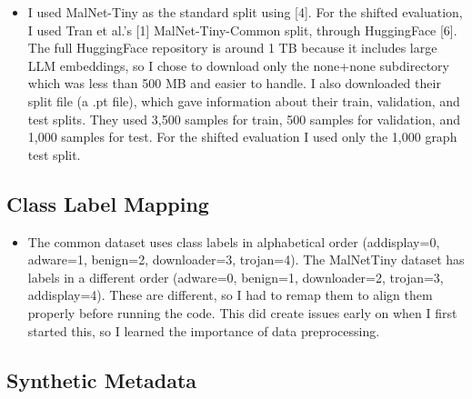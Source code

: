 \documentclass[12pt]{article}
\begin{document}
\begin{itemize}
    \item I used MalNet-Tiny as the standard split using [4]. For the shifted evaluation, I used Tran et al.'s [1] MalNet-Tiny-Common split, through HuggingFace [6]. The full HuggingFace repository is around 1 TB because it includes large LLM embeddings, so I chose to download only the none+none subdirectory which was less than 500 MB and easier to handle. I also downloaded their split file (a .pt file), which gave information about their train, validation, and test splits. They used 3,500 samples for train, 500 samples for validation, and 1,000 samples for test. For the shifted evaluation I used only the 1,000 graph test split. 
\end{itemize}

\subsection{Class Label Mapping}

\begin{itemize}
    \item The common dataset uses class labels in alphabetical order (addisplay=0, adware=1, benign=2, downloader=3, trojan=4). The MalNetTiny dataset has labels in a different order (adware=0, benign=1, downloader=2, trojan=3, addisplay=4). These are different, so I had to remap them to align them properly before running the code. This did create issues early on when I first started this, so I learned the importance of data preprocessing. 

\end{itemize}

\subsection{Synthetic Metadata}
\end{document}
